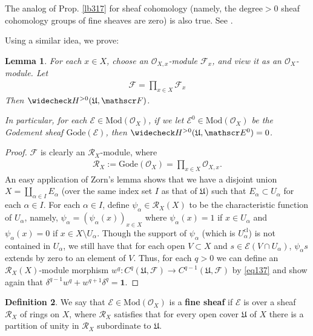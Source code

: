 \documentclass[12pt,b5paper,notitlepage]{report}
\theoremstyle{definition}
\newtheorem{df}{Definition}[section]
\theoremstyle{plain}
\newtheorem{lm}[df]{Lemma}
\newcommand{\fk}{\mathfrak}
\newcommand{\mc}{\mathcal}
\newcommand{\wch}{\widecheck}
\newcommand{\id}{\mathbf{1}}
\newcommand{\scr}{\mathscr}
\newcommand{\cl}{\mathrm{cl}}
\newcommand{\Mod}{\mathrm{Mod}}
\newcommand{\Gode}{\mathrm{Gode}}
\numberwithin{equation}{section}
\begin{document}
The analog of Prop. \ref{lb317} for sheaf cohomology (namely, the degree$>0$ sheaf cohomology groups of fine sheaves are zero) is also true. See \cite[Prop. 4.36]{Voi}.





Using a similar idea, we prove:

\begin{lm}\label{lb320}
For each $x\in X$, choose an $\scr O_{X,x}$-module $\mc F_x$, and view it as an $\scr O_X$-module. Let
\begin{align*}
\scr F=\prod_{x\in X}\mc F_x
\end{align*}
Then $\wch H^{>0}(\fk U,\scr F)$.

In particular, for each $\scr E\in\Mod(\scr O_X)$, if we let $\scr E^0\in\Mod(\scr O_X)$ be the Godement sheaf $\Gode(\scr E)$, then $\wch H^{>0}(\fk U,\scr E^0)=0$.
\end{lm}

\begin{proof}
$\scr F$ is clearly an $\scr R_X$-module, where
\begin{align*}
\scr R_X:=\Gode(\scr O_X)=\prod_{x\in X}\scr O_{X,x}.
\end{align*}
An easy application of Zorn's lemma shows that we have a disjoint union $X=\coprod_{\alpha\in I}E_\alpha$ (over the same index set $I$ as that of $\fk U$) such that $E_\alpha\subset U_\alpha$ for each $\alpha\in I$.
For each $\alpha\in I$, define $\psi_\alpha\in\scr R_X(X)$ to be the characteristic function of $U_\alpha$, namely, $\psi_\alpha=(\psi_\alpha(x))_{x\in X}$ where $\psi_\alpha(x)=1$ if $x\in U_\alpha$ and $\psi_\alpha(x)=0$ if $x\in X\setminus U_\alpha$. Though the support of $\psi_\alpha$ (which is $U_\alpha^\cl$) is not contained in $U_\alpha$, we still have that for each open $V\subset X$ and $s\in\scr E(V\cap U_\alpha)$, $\psi_\alpha s$ extends by zero to an element of $V$. Thus, for each $q>0$ we can define an $\scr R_X(X)$-module morphism $w^q:C^q(\fk U,\scr F)\rightarrow C^{q-1}(\fk U,\scr F)$ by \eqref{eq137} and show again that $\delta^{q-1}w^q+w^{q+1}\delta^q=\id$.
\end{proof}


\begin{df}
We say that $\scr E\in\Mod(\scr O_X)$ is a \textbf{fine sheaf}  if $\scr E$ is over a sheaf $\scr R_X$ of rings on $X$, where $\scr R_X$ satisfies that for every open cover $\fk U$ of $X$ there is a partition of unity in $\scr R_X$ subordinate to $\fk U$.
\end{df}
\end{document}
